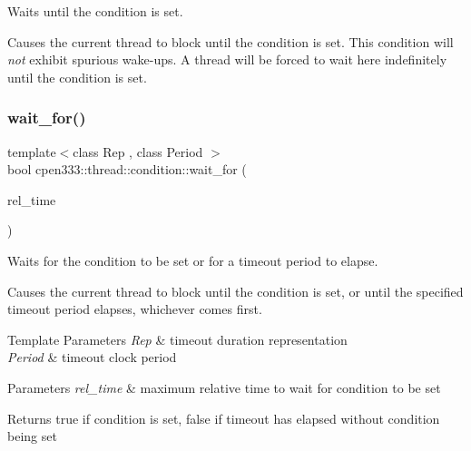 Waits until the condition is set. 

Causes the current thread to block until the condition is set. This condition will {\itshape not} exhibit spurious wake-\/ups. A thread will be forced to wait here indefinitely until the condition is set. \mbox{\label{classcpen333_1_1thread_1_1condition_a14464ca04c1e3e4a6ae62321bfe1ad3a}} 
\subsubsection{\texorpdfstring{wait\+\_\+for()}{wait\_for()}}
{\footnotesize\ttfamily template$<$class Rep , class Period $>$ \\
bool cpen333\+::thread\+::condition\+::wait\+\_\+for (\begin{DoxyParamCaption}\item[{const std\+::chrono\+::duration$<$ Rep, Period $>$ \&}]{rel\+\_\+time }\end{DoxyParamCaption})\hspace{0.3cm}{\ttfamily [inline]}}



Waits for the condition to be set or for a timeout period to elapse. 

Causes the current thread to block until the condition is set, or until the specified timeout period elapses, whichever comes first.


\begin{DoxyTemplParams}{Template Parameters}
{\em Rep} & timeout duration representation \\
\hline
{\em Period} & timeout clock period \\
\hline
\end{DoxyTemplParams}

\begin{DoxyParams}{Parameters}
{\em rel\+\_\+time} & maximum relative time to wait for condition to be set \\
\hline
\end{DoxyParams}
\begin{DoxyReturn}{Returns}
{\ttfamily true} if condition is set, {\ttfamily false} if timeout has elapsed without condition being set 
\end{DoxyReturn}
\mbox{\label{classcpen333_1_1thread_1_1condition_ad415e3be6db8f186d2efaa1c897ffca5}} 

